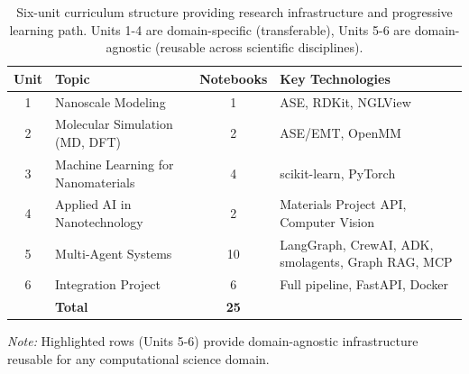 \begin{table}[htbp]
\centering
\caption{Six-unit curriculum structure providing research infrastructure and progressive learning path. Units 1-4 are domain-specific (transferable), Units 5-6 are domain-agnostic (reusable across scientific disciplines).}
\label{tab:curriculum}
\scriptsize
\begin{tabular}{@{}clcp{4cm}@{}}
\toprule
\textbf{Unit} & \textbf{Topic} & \textbf{Notebooks} & \textbf{Key Technologies} \\
\midrule
1 & Nanoscale Modeling & 1 & ASE, RDKit, NGLView \\
2 & Molecular Simulation (MD, DFT) & 2 & ASE/EMT, OpenMM \\
3 & Machine Learning for Nanomaterials & 4 & scikit-learn, PyTorch \\
4 & Applied AI in Nanotechnology & 2 & Materials Project API, Computer Vision \\
\rowcolor{blue!10}
5 & Multi-Agent Systems & 10 & LangGraph, CrewAI, ADK, smolagents, Graph RAG, MCP \\
\rowcolor{blue!10}
6 & Integration Project & 6 & Full pipeline, FastAPI, Docker \\
\midrule
& \textbf{Total} & \textbf{25} & \\
\bottomrule
\end{tabular}

\vspace{0.15cm}
\scriptsize
\textit{Note:} Highlighted rows (Units 5-6) provide domain-agnostic infrastructure reusable for any computational science domain.
\end{table}
